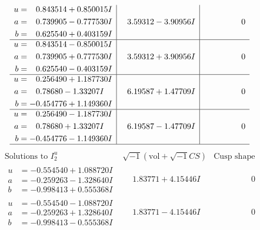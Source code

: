 \documentclass[1p]{elsarticle_modified}
\theoremstyle{definition}
\newcommand{\I}{\sqrt{-1}}
\begin{document}
$$\begin{array}{c|c|c}
\begin{aligned}
u &= \phantom{-}0.843514 + 0.850015 I \\
a &= \phantom{-}0.739905 - 0.777530 I \\
b &= \phantom{-}0.625540 + 0.403159 I\end{aligned}
 & \phantom{-}3.59312 - 3.90956 I & \phantom{-0.000000 } 0 \\ \hline\begin{aligned}
u &= \phantom{-}0.843514 - 0.850015 I \\
a &= \phantom{-}0.739905 + 0.777530 I \\
b &= \phantom{-}0.625540 - 0.403159 I\end{aligned}
 & \phantom{-}3.59312 + 3.90956 I & \phantom{-0.000000 } 0 \\ \hline\begin{aligned}
u &= \phantom{-}0.256490 + 1.187730 I \\
a &= \phantom{-}0.78680 - 1.33207 I \\
b &= -0.454776 + 1.149360 I\end{aligned}
 & \phantom{-}6.19587 + 1.47709 I & \phantom{-0.000000 } 0 \\ \hline\begin{aligned}
u &= \phantom{-}0.256490 - 1.187730 I \\
a &= \phantom{-}0.78680 + 1.33207 I \\
b &= -0.454776 - 1.149360 I\end{aligned}
 & \phantom{-}6.19587 - 1.47709 I & \phantom{-0.000000 } 0\\
 \hline 
 \end{array}$$\newpage$$\begin{array}{c|c|c}  
\text{Solutions to }I^u_{2}& \I (\text{vol} + \sqrt{-1}CS) & \text{Cusp shape}\\
 \hline 
\begin{aligned}
u &= -0.554540 + 1.088720 I \\
a &= -0.259263 - 1.328640 I \\
b &= -0.998413 + 0.555368 I\end{aligned}
 & \phantom{-}1.83771 + 4.15446 I & \phantom{-0.000000 } 0 \\ \hline\begin{aligned}
u &= -0.554540 - 1.088720 I \\
a &= -0.259263 + 1.328640 I \\
b &= -0.998413 - 0.555368 I\end{aligned}
 & \phantom{-}1.83771 - 4.15446 I & \phantom{-0.000000 } 0 \\ \hline\begin{aligned}

\end{aligned}
\end{array}$$
\end{document}
